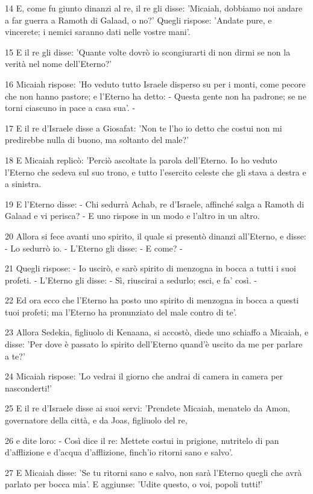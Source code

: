 \par 14 E, come fu giunto dinanzi al re, il re gli disse: 'Micaiah, dobbiamo noi andare a far guerra a Ramoth di Galaad, o no?' Quegli rispose: 'Andate pure, e vincerete; i nemici saranno dati nelle vostre mani'.
\par 15 E il re gli disse: 'Quante volte dovrò io scongiurarti di non dirmi se non la verità nel nome dell'Eterno?'
\par 16 Micaiah rispose: 'Ho veduto tutto Israele disperso su per i monti, come pecore che non hanno pastore; e l'Eterno ha detto: - Questa gente non ha padrone; se ne torni ciascuno in pace a casa sua'. -
\par 17 E il re d'Israele disse a Giosafat: 'Non te l'ho io detto che costui non mi predirebbe nulla di buono, ma soltanto del male?'
\par 18 E Micaiah replicò: 'Perciò ascoltate la parola dell'Eterno. Io ho veduto l'Eterno che sedeva sul suo trono, e tutto l'esercito celeste che gli stava a destra e a sinistra.
\par 19 E l'Eterno disse: - Chi sedurrà Achab, re d'Israele, affinché salga a Ramoth di Galaad e vi perisca? - E uno rispose in un modo e l'altro in un altro.
\par 20 Allora si fece avanti uno spirito, il quale si presentò dinanzi all'Eterno, e disse: - Lo sedurrò io. - L'Eterno gli disse: - E come? -
\par 21 Quegli rispose: - Io uscirò, e sarò spirito di menzogna in bocca a tutti i suoi profeti. - L'Eterno gli disse: - Sì, riuscirai a sedurlo; esci, e fa' così. -
\par 22 Ed ora ecco che l'Eterno ha posto uno spirito di menzogna in bocca a questi tuoi profeti; ma l'Eterno ha pronunziato del male contro di te'.
\par 23 Allora Sedekia, figliuolo di Kenaana, si accostò, diede uno schiaffo a Micaiah, e disse: 'Per dove è passato lo spirito dell'Eterno quand'è uscito da me per parlare a te?'
\par 24 Micaiah rispose: 'Lo vedrai il giorno che andrai di camera in camera per nasconderti!'
\par 25 E il re d'Israele disse ai suoi servi: 'Prendete Micaiah, menatelo da Amon, governatore della città, e da Joas, figliuolo del re,
\par 26 e dite loro: - Così dice il re: Mettete costui in prigione, nutritelo di pan d'afflizione e d'acqua d'afflizione, finch'io ritorni sano e salvo'.
\par 27 E Micaiah disse: 'Se tu ritorni sano e salvo, non sarà l'Eterno quegli che avrà parlato per bocca mia'. E aggiunse: 'Udite questo, o voi, popoli tutti!'
